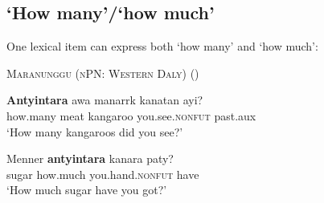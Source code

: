 \documentclass[12pt,egregdoesnotlikesansseriftitles]{scrartcl}
\begin{document}
\subsection{`How many'/`how much'}

One lexical item can express both `how many' and `how much':

\begin{exe}
\ex  \textsc{Maranunggu (nPN: Western Daly)} (\citealt[72]{tryon70})
\begin{xlist}
\ex \gll \textbf{Antyintara}  awa manarrk    kanatan                 ayi?\\
    how.many meat kangaroo you.see.\textsc{nonfut} {\sc past.aux}\\
    `How many kangaroos did you see?'

\ex \gll Menner \textbf{antyintara} kanara                     paty?  \\
    sugar   how.much you.hand.\textsc{nonfut} have \\
    `How much sugar have you got?'
\end{xlist}
\end{exe}

\printbibliography
\end{document}
